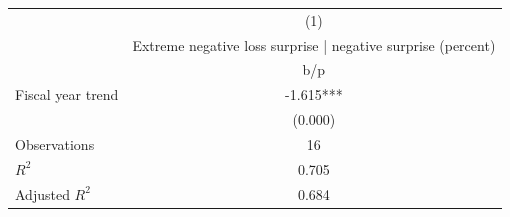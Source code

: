 {
\def\sym#1{\ifmmode^{#1}\else\(^{#1}\)\fi}
\begin{tabular}{l*{1}{c}}
\hline\hline
                    &\multicolumn{1}{c}{(1)}\\
                    &\multicolumn{1}{c}{Extreme negative loss surprise | negative surprise (percent)}\\
                    &         b/p   \\
\hline
Fiscal year trend   &      -1.615***\\
                    &     (0.000)   \\
\hline
Observations        &          16   \\
\(R^{2}\)           &       0.705   \\
Adjusted \(R^{2}\)  &       0.684   \\
\hline\hline
\end{tabular}
}
